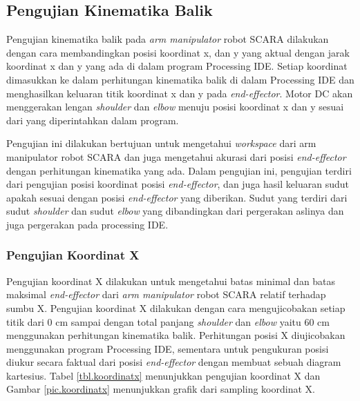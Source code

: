 \subsection{Pengujian Kinematika Balik}
Pengujian kinematika balik pada \textit{arm manipulator} robot SCARA dilakukan dengan cara membandingkan posisi koordinat x, dan y yang aktual dengan jarak koordinat x dan y yang ada di dalam program Processing IDE. Setiap koordinat dimasukkan ke dalam perhitungan kinematika balik di dalam Processing IDE dan menghasilkan keluaran titik koordinat x dan y pada \textit{end-effector}. Motor DC akan menggerakan lengan \textit{shoulder} dan \textit{elbow} menuju posisi koordinat x dan y sesuai dari yang diperintahkan dalam program.

 Pengujian ini dilakukan bertujuan untuk mengetahui \textit{workspace} dari arm manipulator robot SCARA dan juga mengetahui akurasi dari posisi \textit{end-effector} dengan perhitungan kinematika yang ada.
Dalam pengujian ini, pengujian terdiri dari pengujian posisi koordinat posisi \textit{end-effector}, dan juga hasil keluaran sudut apakah sesuai dengan posisi \textit{end-effector} yang diberikan. Sudut yang terdiri dari sudut \textit{shoulder} dan sudut \textit{elbow} yang dibandingkan dari pergerakan aslinya dan juga pergerakan pada processing IDE.  

\subsubsection{Pengujian Koordinat X}
 Pengujian koordinat X dilakukan untuk mengetahui batas minimal dan batas maksimal \textit{end-effector} dari \textit{arm manipulator} robot SCARA relatif terhadap sumbu X. Pengujian koordinat X dilakukan dengan cara mengujicobakan setiap titik dari 0 cm sampai dengan total panjang \textit{shoulder} dan \textit{elbow} yaitu 60 cm menggunakan perhitungan kinematika balik. Perhitungan posisi X diujicobakan menggunakan program Processing IDE, sementara untuk pengukuran posisi diukur secara faktual dari posisi \textit{end-effector} dengan membuat sebuah diagram kartesius. Tabel \ref{tbl.koordinatx} menunjukkan pengujian koordinat X dan Gambar \ref{pic.koordinatx} menunjukkan grafik dari sampling koordinat X.
 
